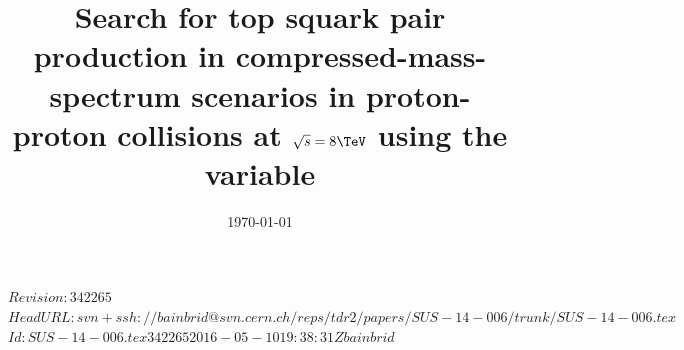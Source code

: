 \RCS$Revision: 342265 $
\RCS$HeadURL: svn+ssh://bainbrid@svn.cern.ch/reps/tdr2/papers/SUS-14-006/trunk/SUS-14-006.tex $
\RCS$Id: SUS-14-006.tex 342265 2016-05-10 19:38:31Z bainbrid $

\newlength\cmsFigWidth
{}




\title{Search for top squark pair production in
  compressed-mass-spectrum scenarios in proton-proton collisions at
  $\sqrt{s} = 8\TeV$ using the \alphat variable}

\date{\today}


